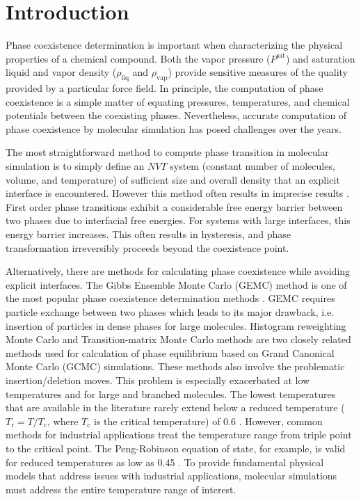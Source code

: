 \documentclass[5p,times]{elsarticle}
\begin{document}

\section{Introduction} \label{sec:introduction}
Phase coexistence determination is important when characterizing the physical properties of a chemical compound. Both the vapor pressure ($P^{\mathrm{sat}}$) and saturation liquid and vapor density ($\rho_{\mathrm{liq}}$ and $\rho_{\mathrm{vap}}$) provide sensitive measures of the quality provided by a particular force field. In principle, the computation of phase coexistence is a simple matter of equating pressures, temperatures, and chemical potentials between the coexisting phases. Nevertheless, accurate computation of phase coexistence by molecular simulation has posed challenges over the years. 

The most straightforward method to compute phase transition in molecular simulation is to simply define an $NVT$ system (constant number of molecules, volume, and temperature) of sufficient size and overall density that an explicit interface is encountered. However this method often results in imprecise results \cite{Frenkel1996}. First order phase transitions exhibit a considerable free energy barrier between two phases due to interfacial free energies. For systems with large interfaces, this energy barrier increases. This often results in hysteresis, and phase transformation irreversibly proceeds beyond the coexistence point. \cite{Frenkel1996} 

Alternatively, there are methods for calculating phase coexistence while avoiding explicit interfaces. The Gibbs Ensemble Monte Carlo (GEMC) method \cite{Panagiotopoulos1987} is one of the most popular phase coexistence determination methods \cite{Paluch2008}.  GEMC requires particle exchange between two phases which leads to its major drawback, i.e. insertion of particles in dense phases for large molecules. Histogram reweighting Monte Carlo and Transition-matrix Monte Carlo methods 
are two closely related methods used for calculation of phase equilibrium based on Grand Canonical Monte Carlo (GCMC) simulations. These methods also involve the problematic insertion/deletion moves. This problem is especially exacerbated  at low temperatures and for large and branched molecules. The lowest temperatures that are available in the literature rarely extend below a reduced temperature ($T_\mathrm{r} = T/T_\mathrm{c}$, where $T_\mathrm{c}$ is the critical temperature) of 0.6 \cite{Martin1998,Potoff2009}. However, common methods for industrial applications treat the temperature range from triple point to the critical point. The Peng-Robinson equation of state, for example, is valid for reduced temperatures as low as 0.45 \cite{Peng1976}. To provide fundamental physical models that address issues with industrial applications, molecular simulations must address the entire temperature range of interest. 
\end{document}
